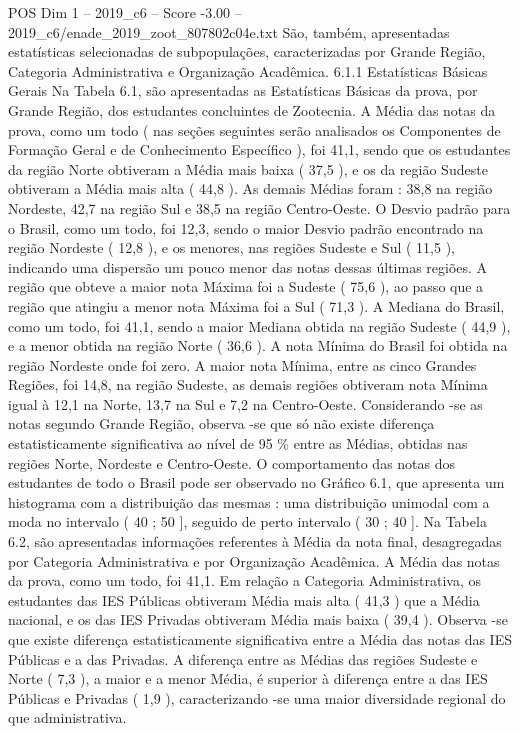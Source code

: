 \begin{textsample}{POS Dim 1 – 2019\_c6 – Score -3.00 – 2019\_c6/enade\_2019\_zoot\_807802c04e.txt}
São, também, apresentadas estatísticas selecionadas de subpopulações, caracterizadas por Grande Região, Categoria Administrativa e Organização Acadêmica. 6.1.1 Estatísticas Básicas Gerais Na Tabela 6.1, são apresentadas as Estatísticas Básicas da prova, por Grande Região, dos estudantes concluintes de Zootecnia.
A Média das notas da prova, como um todo ( nas seções seguintes serão analisados os Componentes de Formação Geral e de Conhecimento Específico ), foi 41,1, sendo que os estudantes da região Norte obtiveram a Média mais baixa ( 37,5 ), e os da região Sudeste obtiveram a Média mais alta ( 44,8 ).
As demais Médias foram : 38,8 na região Nordeste, 42,7 na região Sul e 38,5 na região Centro-Oeste.
O Desvio padrão para o Brasil, como um todo, foi 12,3, sendo o maior Desvio padrão encontrado na região Nordeste ( 12,8 ), e os menores, nas regiões Sudeste e Sul ( 11,5 ), indicando uma dispersão um pouco menor das notas dessas últimas regiões.
A região que obteve a maior nota Máxima foi a Sudeste ( 75,6 ), ao passo que a região que atingiu a menor nota Máxima foi a Sul ( 71,3 ).
A Mediana do Brasil, como um todo, foi 41,1, sendo a maior Mediana obtida na região Sudeste ( 44,9 ), e a menor obtida na região Norte ( 36,6 ).
A nota Mínima do Brasil foi obtida na região Nordeste onde foi zero.
A maior nota Mínima, entre as cinco Grandes Regiões, foi 14,8, na região Sudeste, as demais regiões obtiveram nota Mínima igual à 12,1 na Norte, 13,7 na Sul e 7,2 na Centro-Oeste.
Considerando -se as notas segundo Grande Região, observa -se que só não existe diferença estatisticamente significativa ao nível de 95 \% entre as Médias, obtidas nas regiões Norte, Nordeste e Centro-Oeste.
O comportamento das notas dos estudantes de todo o Brasil pode ser observado no Gráfico 6.1, que apresenta um histograma com a distribuição das mesmas : uma distribuição unimodal com a moda no intervalo ( 40 ; 50 ], seguido de perto intervalo ( 30 ; 40 ].
Na Tabela 6.2, são apresentadas informações referentes à Média da nota final, desagregadas por Categoria Administrativa e por Organização Acadêmica.
A Média das notas da prova, como um todo, foi 41,1.
Em relação a Categoria Administrativa, os estudantes das IES Públicas obtiveram Média mais alta ( 41,3 ) que a Média nacional, e os das IES Privadas obtiveram Média mais baixa ( 39,4 ).
Observa -se que existe diferença estatisticamente significativa entre a Média das notas das IES Públicas e a das Privadas.
A diferença entre as Médias das regiões Sudeste e Norte ( 7,3 ), a maior e a menor Média, é superior à diferença entre a das IES Públicas e Privadas ( 1,9 ), caracterizando -se uma maior diversidade regional do que administrativa.

\end{textsample}
